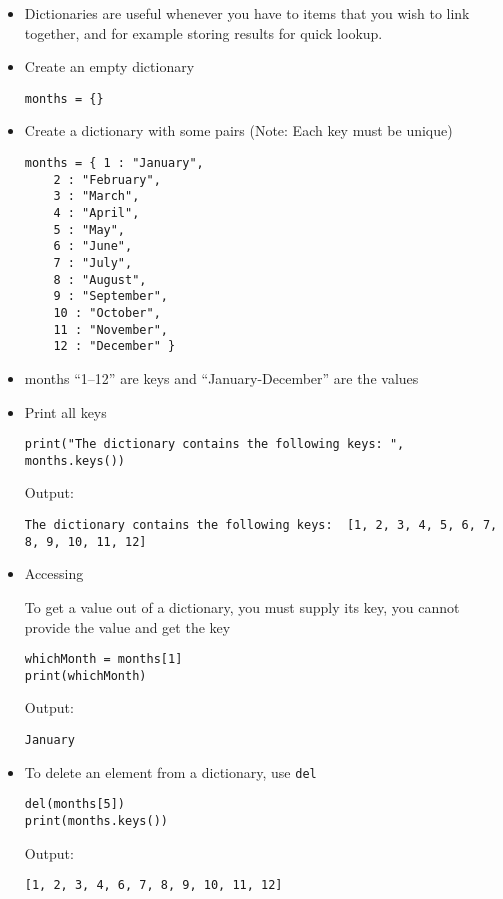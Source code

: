 \documentclass{article}
\begin{document}
\begin{itemize}
	\item Dictionaries are useful whenever you have to items that you wish to link together,
	and for example storing results for quick lookup.

	\item Create an empty dictionary
	\begin{verbatim}
months = {}
	\end{verbatim}

	\item Create a dictionary with some pairs (Note: Each key must be unique)

	\begin{verbatim}
months = { 1 : "January", 
    2 : "February", 
    3 : "March", 
    4 : "April", 
    5 : "May", 
    6 : "June", 
    7 : "July",
    8 : "August",
    9 : "September", 
    10 : "October", 
    11 : "November",
    12 : "December" } 
	\end{verbatim}


	\item months ``1--12'' are keys and ``January-December'' are the values

	\item Print all keys

	\begin{verbatim}
print("The dictionary contains the following keys: ", months.keys())
	\end{verbatim}
Output:
	\begin{verbatim}
The dictionary contains the following keys:  [1, 2, 3, 4, 5, 6, 7, 8, 9, 10, 11, 12]
	\end{verbatim}

	\item Accessing

	To get a value out of a dictionary, you must supply its key, you cannot provide
	the value and get the key
	\begin{verbatim}
whichMonth = months[1]
print(whichMonth)
	\end{verbatim}
Output:
	\begin{verbatim}
January
	\end{verbatim}

	\item To delete an element from a dictionary, use {\tt del}


	\begin{verbatim}
del(months[5])
print(months.keys())
	\end{verbatim}
Output:
	\begin{verbatim}
[1, 2, 3, 4, 6, 7, 8, 9, 10, 11, 12]
	\end{verbatim}


\end{itemize}
\end{document}
